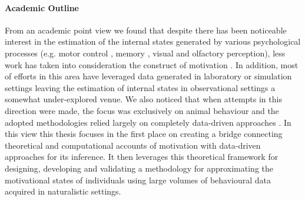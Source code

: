 \paragraph*{Academic Outline}
\label{academic_outline}
From an academic point view we found that despite there has been noticeable interest in the estimation of the internal states generated by various psychological processes (e.g. motor control \cite{gallego2017neural}, memory \cite{derdikman2011manifold, nieh2021geometry}, visual \cite{seung2000manifold, ganmor2015thesaurus} and olfactory \cite{stopfer2003intensity} perception), less work has taken into consideration the construct of motivation \cite{mcclure2003computational, zhang2009neural}. In addition, most of efforts in this area have leveraged data generated in laboratory or simulation settings \cite{eyjolfsdottir2016learning, song2017reward, merel2019deep,calhoun2019unsupervised, seung2000manifold, pang2016dimensionality, luxem2020identifying, pereira2020quantifying, mccullough2021unsupervised, shi2021learning} leaving the estimation of internal states in observational settings a somewhat under-explored venue. We also noticed that when attempts in this direction were made, the focus was exclusively on animal behaviour and the adopted methodologies relied largely on completely data-driven approaches \cite{luxem2020identifying,pereira2020quantifying, mccullough2021unsupervised}. In this view this thesis focuses in the first place on creating a bridge connecting theoretical and computational accounts of motivation with data-driven approaches for its inference. It then leverages this theoretical framework for designing, developing and validating a methodology for approximating the motivational states of individuals using large volumes of behavioural data acquired in naturalistic settings. 

